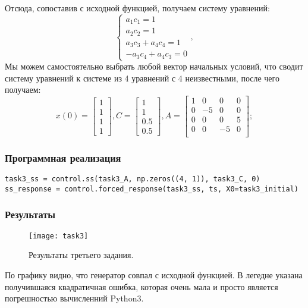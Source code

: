 \documentclass[16pt]{article}
\begin{document}
Отсюда, сопоставив с исходной функцией, получаем систему уравнений:
\[
    \begin{cases}
        a_1c_1 = 1\\
        a_2c_2 = 1\\ 
        a_3c_3 + a_4c_4 = 1\\ 
        -a_3c_4+a_4c_3 = 0
    \end{cases},
    \]
Мы можем самостоятельно выбрать любой вектор начальных условий, что сводит систему уравнений к системе из 4 уравнений с 4 неизвестными, после чего получаем:
\[
    x(0) = \begin{bmatrix}
        1 \\ 
        1 \\
        1 \\
        1
        \end{bmatrix},
    C = \begin{bmatrix}
        1 \\ 
        1 \\
        0.5 \\
        0.5
        \end{bmatrix},
    A = \begin{bmatrix}
        1 & 0 & 0 & 0 \\
        0 & -5 & 0 & 0 \\
        0 & 0 & 0 & 5 \\
        0 & 0 & -5 & 0 \\
        \end{bmatrix};
\]
\subsubsection{Программная реализация}
\begin{verbatim}
task3_ss = control.ss(task3_A, np.zeros((4, 1)), task3_C, 0)
ss_response = control.forced_response(task3_ss, ts, X0=task3_initial)
\end{verbatim}
\newpage

\subsubsection{Результаты}
\begin{figure}[H]
	\centering
	\texttt{[image: task3]}
	\caption{Результаты третьего задания.}
	\label{fig:fig8}
\end{figure}
По графику видно, что генератор совпал с исходной функцией. В легедне указана получившаяся квадратичная ошибка, которая очень мала и просто является погрешностью вычисленний Python3.
\end{document}
